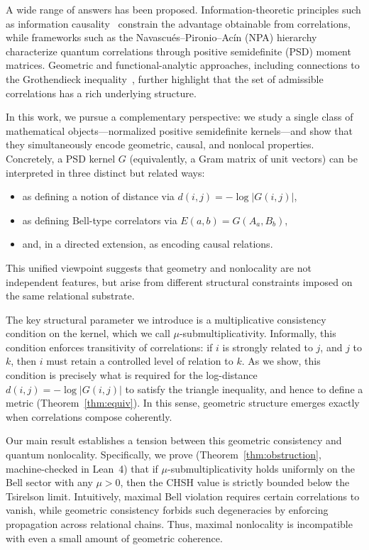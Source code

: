 \documentclass[11pt,a4paper]{article}
\theoremstyle{definition}
\theoremstyle{remark}
\begin{document}
A wide range of answers has been proposed. Information-theoretic principles such as information causality~\cite{pawlowski2009} constrain the advantage obtainable from correlations, while frameworks such as the Navascu\'es--Pironio--Ac\'in (NPA) hierarchy~\cite{npa2007} characterize quantum correlations through positive semidefinite (PSD) moment matrices. Geometric and functional-analytic approaches, including connections to the Grothendieck inequality~\cite{grothendieck2006}, further highlight that the set of admissible correlations has a rich underlying structure.

In this work, we pursue a complementary perspective: we study a single class of mathematical objects---normalized positive semidefinite kernels---and show that they simultaneously encode geometric, causal, and nonlocal properties. Concretely, a PSD kernel $G$ (equivalently, a Gram matrix of unit vectors) can be interpreted in three distinct but related ways:
\begin{itemize}[nosep]
  \item as defining a notion of distance via $d(i,j) = -\log|G(i,j)|$,
  \item as defining Bell-type correlators via $E(a,b) = G(A_a, B_b)$,
  \item and, in a directed extension, as encoding causal relations.
\end{itemize}
This unified viewpoint suggests that geometry and nonlocality are not independent features, but arise from different structural constraints imposed on the same relational substrate.

The key structural parameter we introduce is a multiplicative consistency condition on the kernel, which we call $\mu$-submultiplicativity. Informally, this condition enforces transitivity of correlations: if $i$ is strongly related to $j$, and $j$ to $k$, then $i$ must retain a controlled level of relation to $k$. As we show, this condition is precisely what is required for the log-distance $d(i,j) = -\log|G(i,j)|$ to satisfy the triangle inequality, and hence to define a metric (Theorem~\ref{thm:equiv}). In this sense, geometric structure emerges exactly when correlations compose coherently.

Our main result establishes a tension between this geometric consistency and quantum nonlocality. Specifically, we prove (Theorem~\ref{thm:obstruction}, machine-checked in Lean~4) that if $\mu$-submultiplicativity holds uniformly on the Bell sector with any $\mu > 0$, then the CHSH value is strictly bounded below the Tsirelson limit. Intuitively, maximal Bell violation requires certain correlations to vanish, while geometric consistency forbids such degeneracies by enforcing propagation across relational chains. Thus, maximal nonlocality is incompatible with even a small amount of geometric coherence.
\end{document}
